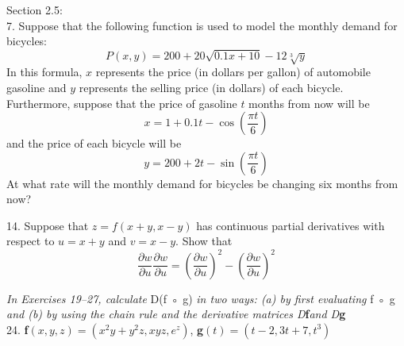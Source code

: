 \documentclass[12pt,letterpaper]{hmcpset}
\begin{document}
\newpage


\begin{problem}
Section 2.5:\\
7. Suppose that the following function is used to model
the monthly demand for bicycles:
\begin{equation}
    P(x,y)=200+20\sqrt{0.1x+10}-12\sqrt[3]{y}
\end{equation}
In this formula, $x$ represents the price (in dollars
per gallon) of automobile gasoline and $y$ represents the selling price (in dollars) of each bicycle.
Furthermore, suppose that the price of gasoline $t$ months from now will be
\begin{equation}
    x=1+0.1t-\cos\left(\frac{\pi t}{6}\right)
\end{equation}
and the price of each bicycle will be 
\begin{equation}
    y=200+2t-\sin\left(\frac{\pi t}{6}\right)
\end{equation}
At what rate will the monthly demand for bicycles be changing six months from now?
\end{problem}
\newpage
\begin{problem}
14. Suppose that $z = f (x + y, x - y)$ has continuous partial derivatives with respect to $u = x + y$ and $v =x - y$. Show that
\begin{equation}
    \frac{\partial w}{\partial u}
    \frac{\partial w}{\partial u} = \left(\frac{\partial w}{\partial u}\right)^2-\left(\frac{\partial w}{\partial u}\right)^2
\end{equation}

\end{problem}

\newpage

\begin{problem}
\textit{In Exercises 19–27, calculate} D(f ◦ g) \textit{in two ways: (a) by first
evaluating }f ◦ g \textit{and (b) by using the chain rule and the derivative matrices D}\textbf{f}\textit{and D}\textbf{g}
\\
24. \textbf{f}$(x,y,z)=(x^2y + y^2z, xyz, e^z)$, \textbf{g}$(t) = (t - 2, 3t + 7, t^3 )$
\end{problem}

\newpage
\end{document}
